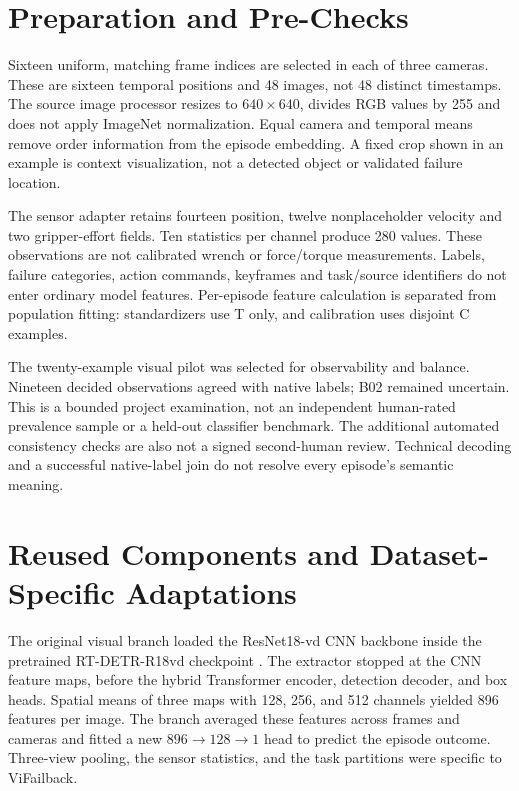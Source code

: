 \section{Preparation and Pre-Checks}
Sixteen uniform, matching frame indices are selected in each of three cameras. These are sixteen temporal positions and 48 images, not 48 distinct timestamps. The source image processor resizes to $640\times640$, divides RGB values by 255 and does not apply ImageNet normalization. Equal camera and temporal means remove order information from the episode embedding. A fixed crop shown in an example is context visualization, not a detected object or validated failure location.

The sensor adapter retains fourteen position, twelve nonplaceholder velocity and two gripper-effort fields. Ten statistics per channel produce 280 values. These observations are not calibrated wrench or force/torque measurements. Labels, failure categories, action commands, keyframes and task/source identifiers do not enter ordinary model features. Per-episode feature calculation is separated from population fitting: standardizers use T only, and calibration uses disjoint C examples.

The twenty-example visual pilot was selected for observability and balance. Nineteen decided observations agreed with native labels; B02 remained uncertain. This is a bounded project examination, not an independent human-rated prevalence sample or a held-out classifier benchmark. The additional automated consistency checks are also not a signed second-human review. Technical decoding and a successful native-label join do not resolve every episode's semantic meaning.

\section{Reused Components and Dataset-Specific Adaptations}
The original visual branch loaded the ResNet18-vd CNN backbone inside the pretrained RT-DETR-R18vd checkpoint \citep{Zhao2024RTDETR}. The extractor stopped at the CNN feature maps, before the hybrid Transformer encoder, detection decoder, and box heads. Spatial means of three maps with 128, 256, and 512 channels yielded 896 features per image. The branch averaged these features across frames and cameras and fitted a new $896\rightarrow128\rightarrow1$ head to predict the episode outcome. Three-view pooling, the sensor statistics, and the task partitions were specific to ViFailback.

